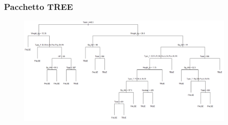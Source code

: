	\begin{frame}
	\frametitle{Pacchetto TREE}
		\begin{center}
			\begin{figure}
				
			\end{figure}
			\begin{figure}
				\includegraphics[width=0.95\textwidth]{img/treeEntr}
			\end{figure}
		\end{center}
	\end{frame}


